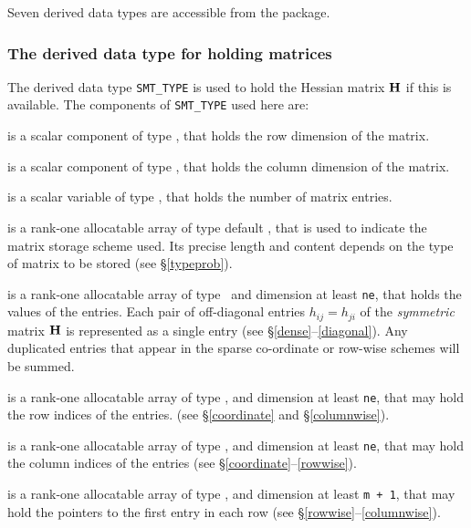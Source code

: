 \documentclass{galahad}
\begin{document}




\galtypes
Seven derived data types are accessible from the package.


\subsubsection{The derived data type for holding matrices}\label{typesmt}
The derived data type {\tt SMT\_TYPE} is used to hold the Hessian matrix ${\mathbf{H}}$
if this is available. The components of {\tt SMT\_TYPE} used here are:

\begin{description}

 is a scalar component of type \integer,
that holds the row dimension of the matrix.

 is a scalar component of type \integer,
that holds the column dimension of the matrix.

 is a scalar variable of type \integer, that
holds the number of matrix entries.

 is a rank-one allocatable array of type default \character, that
is used to indicate the matrix storage scheme used. Its precise length and
content depends on the type of matrix to be stored (see \S\ref{typeprob}).

 is a rank-one allocatable array of type \realdp\,
and dimension at least {\tt ne}, that holds the values of the entries.
Each pair of off-diagonal entries $h_{ij} = h_{ji}$ of the {\em symmetric}
matrix ${\mathbf{H}}$ is represented as a single entry
(see \S\ref{dense}--\ref{diagonal}).
Any duplicated entries that appear in the sparse
co-ordinate or row-wise schemes will be summed.

 is a rank-one allocatable array of type \integer,
and dimension at least {\tt ne}, that may hold the row indices of the entries.
(see \S\ref{coordinate} and \S\ref{columnwise}).

 is a rank-one allocatable array of type \integer,
and dimension at least {\tt ne}, that may hold the column indices of the entries
(see \S\ref{coordinate}--\ref{rowwise}).

 is a rank-one allocatable array of type \integer,
and dimension at least {\tt m + 1}, that may hold the pointers to
the first entry in each row (see \S\ref{rowwise}--\ref{columnwise}).

\end{description}
\end{document}

